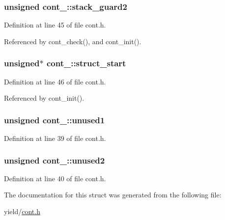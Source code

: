 \subsubsection[{\texorpdfstring{stack\+\_\+guard2}{stack_guard2}}]{\setlength{\rightskip}{0pt plus 5cm}unsigned cont\+\_\+\+::stack\+\_\+guard2}\hypertarget{structcont___af9e24c89ac69a95ae78a6c7f8a237da0}{}\label{structcont___af9e24c89ac69a95ae78a6c7f8a237da0}


Definition at line 45 of file cont.\+h.



Referenced by cont\+\_\+check(), and cont\+\_\+init().

\subsubsection[{\texorpdfstring{struct\+\_\+start}{struct_start}}]{\setlength{\rightskip}{0pt plus 5cm}unsigned$\ast$ cont\+\_\+\+::struct\+\_\+start}\hypertarget{structcont___aa75475b47ca0d3a4a691651402c94fa3}{}\label{structcont___aa75475b47ca0d3a4a691651402c94fa3}


Definition at line 46 of file cont.\+h.



Referenced by cont\+\_\+init().

\subsubsection[{\texorpdfstring{unused1}{unused1}}]{\setlength{\rightskip}{0pt plus 5cm}unsigned cont\+\_\+\+::unused1}\hypertarget{structcont___ab61b08c26f5251cdb06e9b2173da911f}{}\label{structcont___ab61b08c26f5251cdb06e9b2173da911f}


Definition at line 39 of file cont.\+h.

\subsubsection[{\texorpdfstring{unused2}{unused2}}]{\setlength{\rightskip}{0pt plus 5cm}unsigned cont\+\_\+\+::unused2}\hypertarget{structcont___a4571d78e98dbcf7547ea1dc49c7b7a58}{}\label{structcont___a4571d78e98dbcf7547ea1dc49c7b7a58}


Definition at line 40 of file cont.\+h.



The documentation for this struct was generated from the following file\+:\begin{DoxyCompactItemize}
\item 
yield/\hyperlink{cont_8h}{cont.\+h}\end{DoxyCompactItemize}
